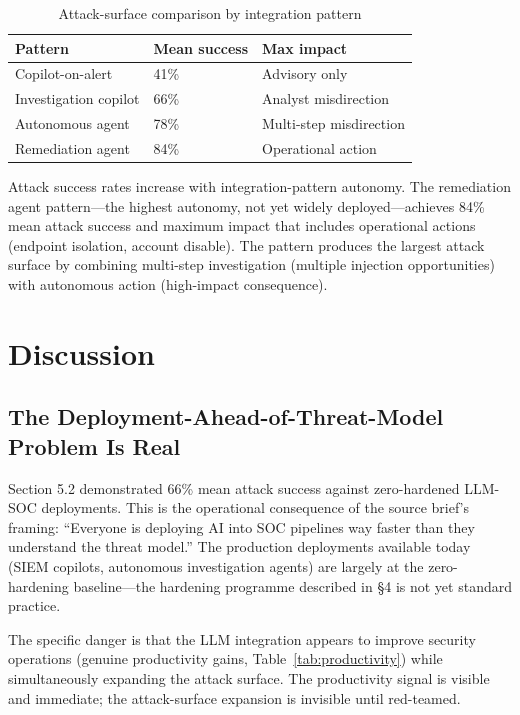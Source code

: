 \documentclass[sigconf,nonacm]{acmart}
\begin{document}
\begin{table}[h]
\caption{Attack-surface comparison by integration pattern}
\label{tab:agent}
\small
\begin{tabularx}{\columnwidth}{@{}p{2.8cm}X X@{}}
\toprule
\textbf{Pattern} & \textbf{Mean success} & \textbf{Max impact} \\
\midrule
Copilot-on-alert  & 41\% & Advisory only \\
Investigation copilot & 66\% & Analyst misdirection \\
Autonomous agent  & 78\% & Multi-step misdirection \\
Remediation agent & 84\% & Operational action \\
\bottomrule
\end{tabularx}
\end{table}

Attack success rates increase with integration-pattern autonomy.
The remediation agent pattern---the highest autonomy, not yet
widely deployed---achieves 84\% mean attack success and
maximum impact that includes operational actions (endpoint
isolation, account disable). The pattern produces the largest
attack surface by combining multi-step investigation (multiple
injection opportunities) with autonomous action (high-impact
consequence).

\section{Discussion}

\subsection{The Deployment-Ahead-of-Threat-Model Problem Is Real}

Section 5.2 demonstrated 66\% mean attack success against
zero-hardened LLM-SOC deployments. This is the operational
consequence of the source brief's framing: ``Everyone is
deploying AI into SOC pipelines way faster than they understand
the threat model.'' The production deployments available today
(SIEM copilots, autonomous investigation agents) are largely
at the zero-hardening baseline---the hardening programme
described in §4 is not yet standard practice.

The specific danger is that the LLM integration appears to
improve security operations (genuine productivity gains,
Table~\ref{tab:productivity}) while simultaneously expanding
the attack surface. The productivity signal is visible and
immediate; the attack-surface expansion is invisible until
red-teamed.
\end{document}
